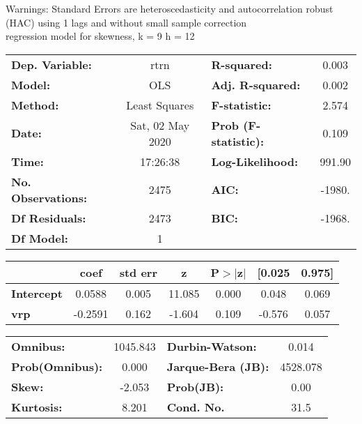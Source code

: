 Warnings: \newline
 [1] Standard Errors are heteroscedasticity and autocorrelation robust (HAC) using 1 lags and without small sample correction\\ 

regression model for skewness, k = 9 h = 12\begin{center}
\begin{tabular}{lclc}
\toprule
\textbf{Dep. Variable:}    &       rtrn       & \textbf{  R-squared:         } &     0.003   \\
\textbf{Model:}            &       OLS        & \textbf{  Adj. R-squared:    } &     0.002   \\
\textbf{Method:}           &  Least Squares   & \textbf{  F-statistic:       } &     2.574   \\
\textbf{Date:}             & Sat, 02 May 2020 & \textbf{  Prob (F-statistic):} &    0.109    \\
\textbf{Time:}             &     17:26:38     & \textbf{  Log-Likelihood:    } &    991.90   \\
\textbf{No. Observations:} &        2475      & \textbf{  AIC:               } &    -1980.   \\
\textbf{Df Residuals:}     &        2473      & \textbf{  BIC:               } &    -1968.   \\
\textbf{Df Model:}         &           1      & \textbf{                     } &             \\
\bottomrule
\end{tabular}
\begin{tabular}{lcccccc}
                   & \textbf{coef} & \textbf{std err} & \textbf{z} & \textbf{P$> |$z$|$} & \textbf{[0.025} & \textbf{0.975]}  \\
\midrule
\textbf{Intercept} &       0.0588  &        0.005     &    11.085  &         0.000        &        0.048    &        0.069     \\
\textbf{vrp}       &      -0.2591  &        0.162     &    -1.604  &         0.109        &       -0.576    &        0.057     \\
\bottomrule
\end{tabular}
\begin{tabular}{lclc}
\textbf{Omnibus:}       & 1045.843 & \textbf{  Durbin-Watson:     } &    0.014  \\
\textbf{Prob(Omnibus):} &   0.000  & \textbf{  Jarque-Bera (JB):  } & 4528.078  \\
\textbf{Skew:}          &  -2.053  & \textbf{  Prob(JB):          } &     0.00  \\
\textbf{Kurtosis:}      &   8.201  & \textbf{  Cond. No.          } &     31.5  \\
\bottomrule
\end{tabular}
\end{center}

